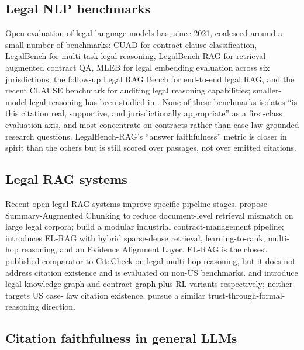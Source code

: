 \documentclass[11pt]{article}
\begin{document}
\subsection{Legal NLP benchmarks}
\label{sec:related:benchmarks}

Open evaluation of legal language models has, since 2021, coalesced
around a small number of benchmarks: CUAD
\citep{hendrycks2021cuad} for contract clause classification,
LegalBench \citep{guha2022legalbench} for multi-task legal reasoning,
LegalBench-RAG \citep{pipitone2024legalbenchrag} for retrieval-
augmented contract QA, MLEB \citep{butler2025mleb} for legal embedding
evaluation across six jurisdictions, the follow-up Legal RAG Bench
\citep{butler2026legalragbench} for end-to-end legal RAG, and the
recent CLAUSE benchmark \citep{choudhury2025clause} for auditing legal
reasoning capabilities; smaller-model legal reasoning has been studied
in \citep{vaddi2026smallmodels}. None of these benchmarks isolates
``is this citation real, supportive, and jurisdictionally
appropriate'' as a first-class evaluation axis, and most concentrate
on contracts rather than case-law-grounded research questions.
LegalBench-RAG's ``answer faithfulness'' metric is closer in spirit
than the others but is still scored over passages, not over emitted
citations.

\subsection{Legal RAG systems}
\label{sec:related:legalrag}

Recent open legal RAG systems improve specific pipeline stages.
\citet{reuter2025reliableretrieval} propose Summary-Augmented Chunking
to reduce document-level retrieval mismatch on large legal corpora;
\citet{topollai2025contracts} build a modular industrial
contract-management pipeline; \citet{wankhade2026elrag} introduces
EL-RAG with hybrid sparse-dense retrieval, learning-to-rank, multi-hop
reasoning, and an Evidence Alignment Layer. EL-RAG is the closest
published comparator to CiteCheck on legal multi-hop reasoning, but it
does not address citation existence and is evaluated on non-US
benchmarks. \citet{jia2025legalkg} and
\citet{dechtiar2025graphgrpolex} introduce legal-knowledge-graph and
contract-graph-plus-RL variants respectively; neither targets US case-
law citation existence. \citet{chen2025l4m} pursue a similar
trust-through-formal-reasoning direction.

\subsection{Citation faithfulness in general LLMs}
\label{sec:related:faithfulness}
\end{document}

